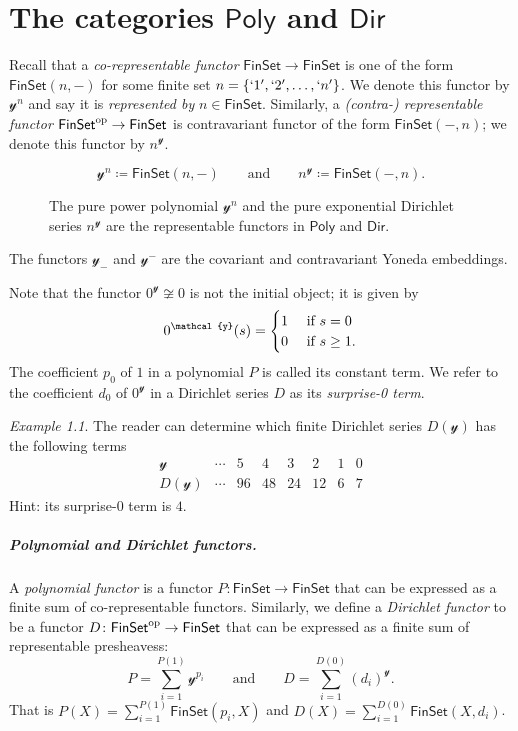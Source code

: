 \documentclass[11pt, article, one side]{memoir}
\theoremstyle{theorem}
\theoremstyle{definition}
\theoremstyle{remark}
\newtheorem{example}[equation]{Example}
\newcommand{\Cat}[1]{\mathsf{#1}}%
\newcommand{\op}{^\tn{op}}
\newcommand{\tn}[1]{\textnormal{#1}}
\newcommand{\finset}{\Cat{FinSet}}
\newcommand{\yon}{\mathcal{y}}
\newcommand{\poly}{\Cat{Poly}}
\newcommand{\dir}{\Cat{Dir}}
\newcommand{\qqand}{\qquad\text{and}\qquad}
\begin{document}
\chapter{The categories $\poly$ and $\dir$}
Recall that a \emph{co-representable functor} $\finset\to\finset$ is one of the form $\finset(n, -)$ for some finite set $n=\{`1', `2',\ldots,`n'\}$. We denote this functor by $\yon^n$ and say it is \emph{represented by} $n\in\finset$. Similarly, a \emph{(contra-) representable functor} $\finset\op\to\finset$ is contravariant functor of the form $\finset(-,n)$; we denote this functor by $n^\yon$.
\begin{figure}
\[
  \yon^n \coloneqq \finset(n,-)
  \qqand
  n^\yon\coloneqq\finset(-,n).
\]
  \caption{The pure power polynomial $\yon^n$ and the pure exponential Dirichlet series $n^\yon$ are the representable functors in $\poly$ and $\dir$.}
\end{figure}
The functors $\yon_-$ and $\yon^-$ are the covariant and contravariant Yoneda embeddings.

Note that the functor $0^\yon\not\cong 0$ is not the initial object; it is given by
\[
0^\yon(s)=
\begin{cases}
1&\tn{ if } s=0\\
0&\tn{ if } s\geq1.
\end{cases}
\]
The coefficient $p_0$ of $1$ in a polynomial $P$ is called its constant term. We refer to the coefficient $d_0$ of $0^\yon$ in a Dirichlet series $D$ as its \emph{surprise-0 term}.

\begin{example}
The reader can determine which finite Dirichlet series $D(\yon)$ has the following terms
\[
\begin{array}{c|ccccccc}
\yon&
\cdots&
5&
4&
3&
2&
1&
0
\\\hline
D(\yon)&
\cdots&
96&
48&
24&
12&
6&
7
\end{array}
\]
Hint: its surprise-0 term is $4$.
\end{example}

\paragraph{Polynomial and Dirichlet functors.}
A \emph{polynomial functor} \cite{GambinoKock} is a functor $P\colon\finset\to\finset$ that can be expressed as a finite sum of co-representable functors. Similarly, we define a \emph{Dirichlet functor} to be a functor $D\colon\finset\op\to\finset$ that can be expressed as a finite sum of representable presheavess:
\begin{equation}\label{eqn.finite_sum}
  P=\sum_{i=1}^{P(1)}\yon^{p_i}
  \qqand
  D=\sum_{i=1}^{D(0)}(d_i)^\yon.
\end{equation}
That is $P(X)=\sum_{i=1}^{P(1)}\finset(p_i,X)$ and $D(X)=\sum_{i=1}^{D(0)}\finset(X,d_i)$.
\end{document}
